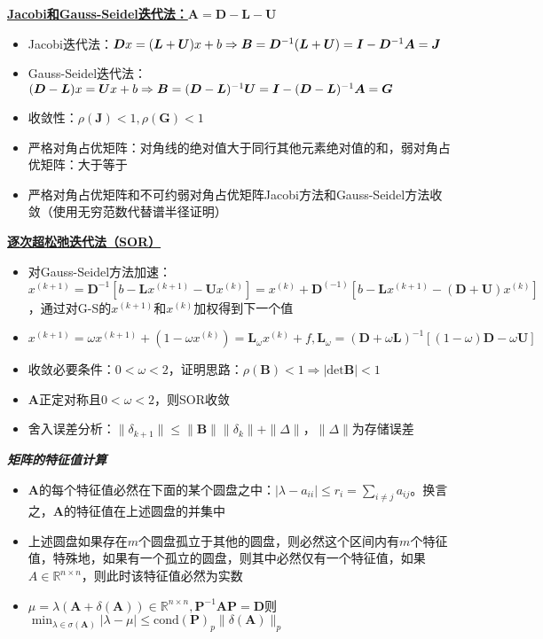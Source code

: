\documentclass[UTF8,a4paper,landscape,8pt]{paper}
\renewcommand{\subsection}[1]{{\small\textbf{\underline{#1}}}\\ }
\renewcommand{\section}[1]{{\normalsize\textbf{\emph{#1}}}\\ }
\newcommand{\List}[1]{\begin{itemize}[fullwidth,itemindent=0em] #1 \end{itemize}}
\begin{document}
\begin{multicols}{4}
    \subsection{Jacobi和Gauss-Seidel迭代法：$\bm A = \bm D - \bm L - \bm U$}
    \List{
        \item {Jacobi迭代法：$\bm Dx = (\bm L + \bm U)x + b\Rightarrow\\\bm  B = \bm D^{-1}(\bm L + \bm U) = \bm I - \bm D^{-1}\bm A = \bm J$}
        \item {Gauss-Seidel迭代法：$(\bm D - \bm L) x = \bm U x + b \Rightarrow\\\bm  B = (\bm D - \bm L)^{-1}\bm U = \bm I - (\bm D - \bm L)^{-1}\bm A = \bm G$}
        \item {收敛性：$\rho (\bm J) <1,\rho(\bm G) <1$}
        \item {严格对角占优矩阵：对角线的绝对值大于同行其他元素绝对值的和，弱对角占优矩阵：大于等于}
        \item {严格对角占优矩阵和不可约弱对角占优矩阵Jacobi方法和Gauss-Seidel方法收敛（使用无穷范数代替谱半径证明）}
    }
    \subsection{逐次超松弛迭代法（SOR）}
    \List{
        \item {对Gauss-Seidel方法加速：$x^{(k+1)} = \bm D^{-1}[b - \bm Lx^{(k+1)} - \bm Ux^{(k)}] = x^{(k)} + \bm D^{(-1)}[b - \bm Lx^{(k+1)} - (\bm D + \bm U)x^{(k)}]$，通过对G-S的$x^{(k+1)}$和$x^{(k)}$加权得到下一个值}
        \item {$x^{(k+1)} = \omega x^{(k+1)} + (1 - \omega x^{(k)}) = \bm L_\omega x^{(k)} + f, \bm L_\omega = (\bm D + \omega \bm L)^{-1}[(1-\omega)\bm D -\omega \bm U]$}
        \item {收敛必要条件：$0 < \omega < 2$，证明思路：$\rho(\bm B) < 1 \Rightarrow |\mathrm{det}\bm B| < 1$}
        \item {$\bm A$正定对称且$0 < \omega < 2$，则SOR收敛}
        \item {舍入误差分析：$\|\delta_{k+1}\| \le \|\bm B\| \|\delta_k\| + \|\Delta\|$，$\|\Delta\|$为存储误差}
    }
\section{矩阵的特征值计算}
    \List{
        \item {$\bm A$的每个特征值必然在下面的某个圆盘之中：$|\lambda -a_{ii}| \le r_i =\sum_{i\ne j}a_{ij}$。换言之，$\bm A$的特征值在上述圆盘的并集中}
        \item {上述圆盘如果存在$m$个圆盘孤立于其他的圆盘，则必然这个区间内有$m$个特征值，特殊地，如果有一个孤立的圆盘，则其中必然仅有一个特征值，如果$A\in\mathbb R^{n\times n}$，则此时该特征值必然为实数}
        \item {$\mu =\lambda(\bm A + \delta(\bm A))\in \mathbb R^{n\times n}, \bm P^{-1}\bm A\bm P = \bm D$则$\min_{\lambda\in\sigma(\bm A)}|\lambda-\mu| \le \mathrm{cond}(\bm P)_p\|\delta(\bm A)\|_p$}
    }

\end{multicols}
\end{document}
